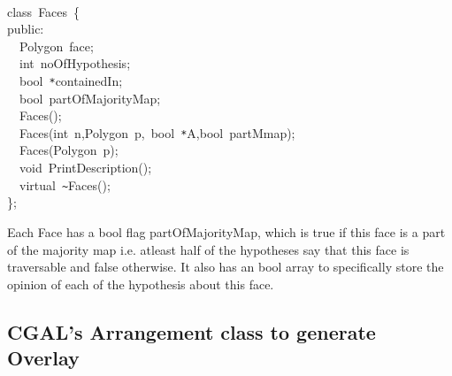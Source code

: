 {
\noindent \ttfamily
\jttstylea \\
\jttstylee class~\jttstylek Faces~\jttstylei \{\\
\jttstylee public\jttstylek :\\
\jttstylea ~~\jttstylek Polygon~face;\\
\jttstylea ~~\jttstylej int~\jttstylek noOfHypothesis;\\
\jttstylea ~~\jttstylek bool~\verb#*#containedIn;\\
\jttstylea ~~\jttstylek bool~partOfMajorityMap;\\
\jttstylea ~~\jttstylek Faces\jttstylei ()\jttstylek ;\\
\jttstylea ~~\jttstylek Faces\jttstylei (\jttstylej int~\jttstylek n,Polygon~p,~bool~\verb#*#A,bool~partMmap\jttstylei )\jttstylek ;\\
\jttstylea ~~\jttstylek Faces\jttstylei (\jttstylek Polygon~p\jttstylei )\jttstylek ;\\
\jttstylea ~~\jttstylej void~\jttstylek PrintDescription\jttstylei ()\jttstylek ;\\
\jttstylea ~~\jttstylek virtual~\verb#~#Faces\jttstylei ()\jttstylek ;\\
\jttstylei \}\jttstylek ;\\

}

Each Face has a bool flag partOfMajorityMap, which is true if this face is a part of the majority map i.e. atleast half of the 
hypotheses say that this face is traversable and false otherwise. It also has an bool array to specifically store the opinion of
 each of the hypothesis about this face.

\newpage
\subsection {CGAL's Arrangement class to generate Overlay}




